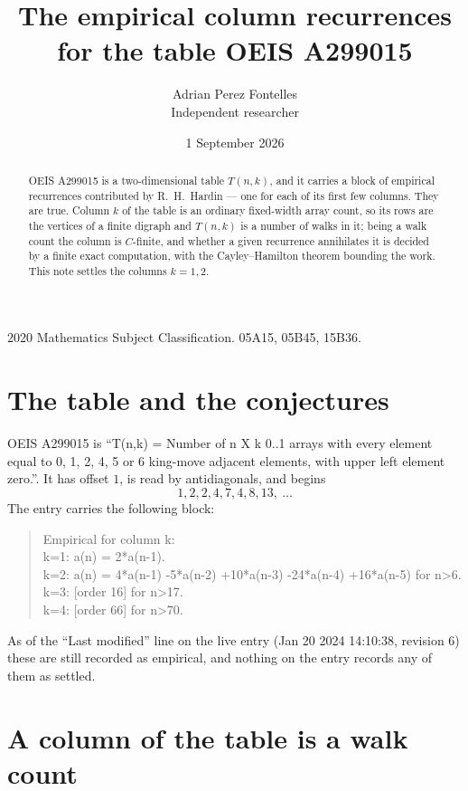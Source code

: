 \documentclass[11pt,a4paper]{article}
\title{The empirical column recurrences for the table OEIS A299015}
\author{Adrian Perez Fontelles\\ \small Independent researcher}
\date{1 September 2026}
\theoremstyle{plain}
\theoremstyle{definition}
\begin{document}
\maketitle

\begin{abstract}
OEIS A299015 is a two-dimensional table $T(n,k)$, and it carries a block of empirical
recurrences contributed by R.~H.~Hardin --- one for each of its first few columns. They are
true. Column $k$ of the table is an ordinary fixed-width array count, so its rows are the
vertices of a finite digraph and $T(n,k)$ is a number of walks in it; being a walk count the
column is $C$-finite, and whether a given recurrence annihilates it is decided by a finite
exact computation, with the Cayley--Hamilton theorem bounding the work. This note settles the columns $k=1, 2$.
\end{abstract}

\noindent\small 2020 Mathematics Subject Classification. 05A15, 05B45, 15B36.\normalsize

\section{The table and the conjectures}

OEIS A299015 is ``T(n,k) = Number of n X k 0..1 arrays with every element equal to 0, 1, 2, 4, 5 or 6 king-move adjacent elements, with upper left element zero.''. It has offset $1$, is
read by antidiagonals, and begins
\[
1, 2, 2, 4, 7, 4, 8, 13,\ \dots
\]
The entry carries the following block:
\begin{quote}\small
Empirical for column k:\\
k=1: a(n) = 2*a(n-1).\\
k=2: a(n) = 4*a(n-1) -5*a(n-2) +10*a(n-3) -24*a(n-4) +16*a(n-5) for n>6.\\
k=3: [order 16] for n>17.\\
k=4: [order 66] for n>70.\\
\end{quote}
As of the ``Last modified'' line on the live entry (Jan 20 2024 14:10:38, revision 6) these are still
recorded as empirical, and nothing on the entry records any of them as settled.

\section{A column of the table is a walk count}
\end{document}
